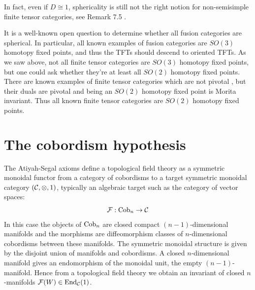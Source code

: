 \documentclass{amsart}
\begin{document}
In fact, even if $D \cong 1$, sphericality is still not the right notion for non-semisimple finite tensor categories, see Remark 7.5 \cite{???}.

\begin{remark}
It is a well-known open question to determine whether all fusion categories are spherical.  In particular, all known examples of fusion categories are $SO(3)$ homotopy fixed points, and thus the TFTs should descend to oriented TFTs.  As we saw above, not all finite tensor categories are $SO(3)$ homotopy fixed points, but one could ask whether they're at least all $SO(2)$ homotopy fixed points.  There are known examples of finite tensor categories which are not pivotal \cite{???}, but their duals are pivotal and being an $SO(2)$ homotopy fixed point is Morita invariant.  Thus all known finite tensor categories are $SO(2)$ homotopy fixed points.
\end{remark}

\appendix 
\renewcommand{\thesubsection}{\Alph{section}.{\arabic{subsection}}}

\section{The cobordism hypothesis} \label{app:ch}

The Atiyah-Segal axioms define a topological field theory as a symmetric monoidal functor from a category of cobordisms to a target symmetric monoidal category $(\mathcal C, \otimes, 1)$, typically an algebraic target such as the category of vector spaces: 
\begin{equation*}
	\mathcal F: \mathrm{Cob}_n \to \mathcal C
\end{equation*}
In this case the objects of $\mathrm{Cob}_n$ are closed compact $(n-1)$-dimensional manifolds and the morphisms are diffeomorphism classes of $n$-dimensional cobordisms between these manifolds. The symmetric monoidal structure is given by the disjoint union of manifolds and cobordisms. A closed $n$-dimensional manifold gives an endomorphism of the monoidal unit, the empty $(n-1)$-manifold. Hence from a topological field theory we obtain an invariant of closed $n$-manifolds $\mathcal F(W) \in \operatorname{End}_{\mathcal C}(1)$.  
\end{document}
